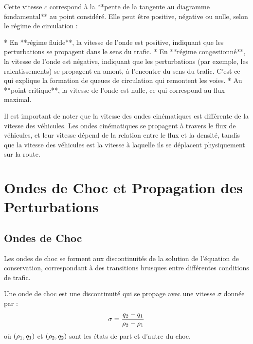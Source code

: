 Cette vitesse $c$ correspond à la **pente de la tangente au diagramme fondamental** au point considéré. Elle peut être positive, négative ou nulle, selon le régime de circulation :

*   En **régime fluide**, la vitesse de l'onde est positive, indiquant que les perturbations se propagent dans le sens du trafic.
*   En **régime congestionné**, la vitesse de l'onde est négative, indiquant que les perturbations (par exemple, les ralentissements) se propagent en amont, à l'encontre du sens du trafic. C'est ce qui explique la formation de queues de circulation qui remontent les voies.
*   Au **point critique**, la vitesse de l'onde est nulle, ce qui correspond au flux maximal.

Il est important de noter que la vitesse des ondes cinématiques est différente de la vitesse des véhicules. Les ondes cinématiques se propagent à travers le flux de véhicules, et leur vitesse dépend de la relation entre le flux et la densité, tandis que la vitesse des véhicules est la vitesse à laquelle ils se déplacent physiquement sur la route.

\section{Ondes de Choc et Propagation des Perturbations}
\label{sec:onde_choc}

\subsection{Ondes de Choc}
\label{subsec:chocs}

Les ondes de choc se forment aux discontinuités de la solution de l'équation de conservation, correspondant à des transitions brusques entre différentes conditions de trafic.

\begin{definition}
Une onde de choc est une discontinuité qui se propage avec une vitesse $\sigma$ donnée par :
\begin{align}
\sigma = \frac{q_2 - q_1}{\rho_2 - \rho_1}
\label{eq:shock_speed}
\end{align}
où $(\rho_1, q_1)$ et $(\rho_2, q_2)$ sont les états de part et d'autre du choc.
\end{definition}


